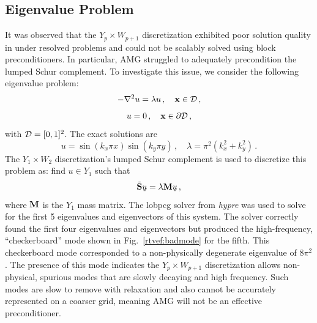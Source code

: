 \documentclass[../doc.tex]{subfiles}
\begin{document}
\subsection{Eigenvalue Problem} \label{rtvef_sec:badmodes}
It was observed that the $Y_p \times W_{p+1}$ discretization exhibited poor solution quality in under resolved problems and could not be scalably solved using block preconditioners. In particular, AMG struggled to adequately precondition the lumped Schur complement. To investigate this issue, we consider the following eigenvalue problem: 
	\begin{equation}
		-\nabla^2 u = \lambda u \,, \quad \boldsymbol{\mathrm{x}} \in \mathcal{D}\,, 
	\end{equation}
	\begin{equation}
		u = 0 \,, \quad \boldsymbol{\mathrm{x}} \in \partial \mathcal{D} \,,
	\end{equation}
with $\mathcal{D} = [0,1]^2$. 
The exact solutions are 
	\begin{equation}
		u = \sin(k_x \pi x) \sin(k_y \pi y) \,, \quad \lambda = \pi^2(k_x^2 + k_y^2) \,. 
	\end{equation}
The $Y_1 \times W_2$ discretization's lumped Schur complement is used to discretize this problem as: find $u \in Y_1$ such that 
	\begin{equation}
		\tilde{\boldsymbol{\mathrm{S}}} \,\underline{\!u\!}\, = \lambda \boldsymbol{\mathrm{M}} \,\underline{\!u\!}\, \,,
	\end{equation}
where $\boldsymbol{\mathrm{M}}$ is the $Y_1$ mass matrix. The \gls{lobpcg} solver from \emph{hypre} was used to solve for the first 5 eigenvalues and eigenvectors of this system. The solver correctly found the first four eigenvalues and eigenvectors but produced the high-frequency, ``checkerboard'' mode shown in Fig.~\ref{rtvef:badmode} for the fifth. This checkerboard mode corresponded to a non-physically degenerate eigenvalue of $8\pi^2$. The presence of this mode indicates the $Y_p \times W_{p+1}$ discretization allows non-physical, spurious modes that are slowly decaying and high frequency. Such modes are slow to remove with relaxation and also cannot be accurately represented on a coarser grid, meaning AMG will not be an effective preconditioner. 
\end{document}
